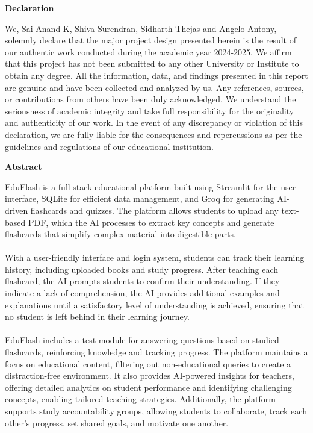 \documentclass{report}
\begin{document}
\newpage 
\begin{center}
\textbf{\LARGE Declaration}
\end{center}
\vspace{3em}

We, Sai Anand K, Shiva Surendran, Sidharth Thejas and Angelo Antony, solemnly declare that the major project design presented herein is the result of our authentic work conducted during the academic year 2024-2025. We affirm that this project has not been submitted to any other University or Institute to obtain any degree. All the information, data, and findings presented in this report are genuine and have been collected and analyzed by us. Any references, sources, or contributions from others have been duly acknowledged. We understand the seriousness of academic integrity and take full responsibility for the originality and authenticity of our work. In the event of any discrepancy or violation of this declaration, we are fully liable for the consequences and repercussions as per the guidelines and regulations of our educational institution.\\
\newpage
\begin{center}
\textbf{\LARGE Abstract}
\end{center}
\vspace{3em}
\hspace{2em}\Large EduFlash is a full-stack educational platform built using Streamlit for the user interface, SQLite for efficient data management, and Groq for generating AI-driven flashcards and quizzes. The platform allows students to upload any text-based PDF, which the AI processes to extract key concepts and generate flashcards that simplify complex material into digestible parts.
\\
\\
With a user-friendly interface and login system, students can track their learning history, including uploaded books and study progress. After teaching each flashcard, the AI prompts students to confirm their understanding. If they indicate a lack of comprehension, the AI provides additional examples and explanations until a satisfactory level of understanding is achieved, ensuring that no student is left behind in their learning journey.
\\
\\
EduFlash includes a test module for answering questions based on studied flashcards, reinforcing knowledge and tracking progress. The platform maintains a focus on educational content, filtering out non-educational queries to create a distraction-free environment. It also provides AI-powered insights for teachers, offering detailed analytics on student performance and identifying challenging concepts, enabling tailored teaching strategies. Additionally, the platform supports study accountability groups, allowing students to collaborate, track each other’s progress, set shared goals, and motivate one another.
\end{document}
